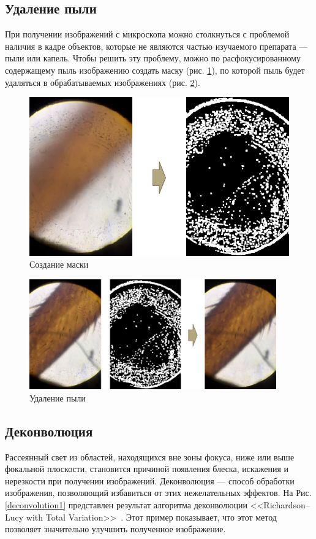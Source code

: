 \documentclass[14pt]{matmex-diploma-custom}
\begin{document}
\subsection{Удаление пыли}

При получении изображений с микроскопа можно столкнуться с проблемой наличия в кадре объектов, которые не являются частью изучаемого препарата --- пыли или капель. Чтобы решить эту проблему, можно по расфокусированному содержащему пыль изображению создать маску (рис. \ref{dust_map1}), по которой пыль будет удаляться в обрабатываемых изображениях (рис. \ref{dust_filtering1}).

\begin{figure}[h]
    \centering
    \includegraphics[width=1.0\textwidth]{figures/dust1.png}
    \caption{Создание маски}
    \label{dust_map1}
\end{figure}

\newpage

\begin{figure}[h]
    \centering
    \includegraphics[width=0.95\textwidth]{figures/dust2.png}
    \caption{Удаление пыли}
    \label{dust_filtering1}
\end{figure}


\subsection{Деконволюция}
Рассеянный свет из областей, находящихся вне зоны фокуса, ниже или выше фокальной плоскости, становится причиной появления блеска, искажения и нерезкости при получении изображений. Деконволюция –-- способ обработки изображения, позволяющий избавиться от этих нежелательных эффектов. На Рис.\ref{deconvolution1} представлен результат алгоритма деконволюции <<Richardson–Lucy with Total Variation>>~\cite{RLTV}. Этот пример показывает, что этот метод позволяет значительно улучшить полученное изображение.
\end{document}
